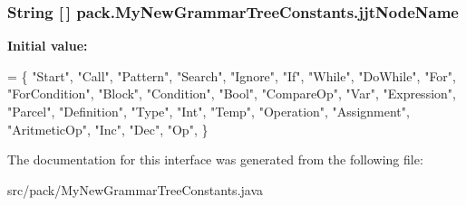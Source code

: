 \subsubsection[{\texorpdfstring{jjt\+Node\+Name}{jjtNodeName}}]{\setlength{\rightskip}{0pt plus 5cm}String \mbox{[}$\,$\mbox{]} pack.\+My\+New\+Grammar\+Tree\+Constants.\+jjt\+Node\+Name}\hypertarget{interfacepack_1_1_my_new_grammar_tree_constants_aacadf45edf8d47a21ada3b4454057b51}{}\label{interfacepack_1_1_my_new_grammar_tree_constants_aacadf45edf8d47a21ada3b4454057b51}
{\bfseries Initial value\+:}
\begin{DoxyCode}
= \{
    \textcolor{stringliteral}{"Start"},
    \textcolor{stringliteral}{"Call"},
    \textcolor{stringliteral}{"Pattern"},
    \textcolor{stringliteral}{"Search"},
    \textcolor{stringliteral}{"Ignore"},
    \textcolor{stringliteral}{"If"},
    \textcolor{stringliteral}{"While"},
    \textcolor{stringliteral}{"DoWhile"},
    \textcolor{stringliteral}{"For"},
    \textcolor{stringliteral}{"ForCondition"},
    \textcolor{stringliteral}{"Block"},
    \textcolor{stringliteral}{"Condition"},
    \textcolor{stringliteral}{"Bool"},
    \textcolor{stringliteral}{"CompareOp"},
    \textcolor{stringliteral}{"Var"},
    \textcolor{stringliteral}{"Expression"},
    \textcolor{stringliteral}{"Parcel"},
    \textcolor{stringliteral}{"Definition"},
    \textcolor{stringliteral}{"Type"},
    \textcolor{stringliteral}{"Int"},
    \textcolor{stringliteral}{"Temp"},
    \textcolor{stringliteral}{"Operation"},
    \textcolor{stringliteral}{"Assignment"},
    \textcolor{stringliteral}{"AritmeticOp"},
    \textcolor{stringliteral}{"Inc"},
    \textcolor{stringliteral}{"Dec"},
    \textcolor{stringliteral}{"Op"},
  \}
\end{DoxyCode}


The documentation for this interface was generated from the following file\+:\begin{DoxyCompactItemize}
\item 
src/pack/My\+New\+Grammar\+Tree\+Constants.\+java\end{DoxyCompactItemize}
